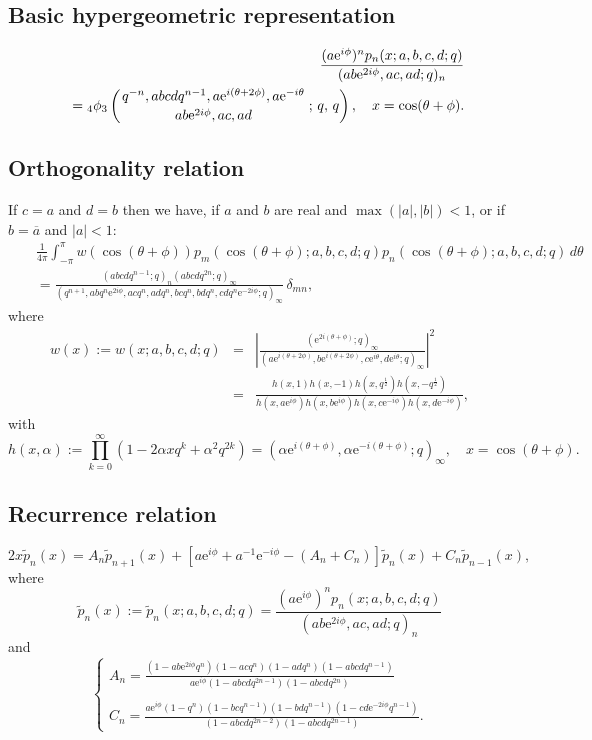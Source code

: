 \documentclass[envcountchap,graybox]{svmono}
\newcommand{\qhyp}[5]{\mbox{}_{#1}{\phi}_{#2}
\left(\genfrac{}{}{0pt}{}{#3}{#4}\,;\,q,\,#5\right)}
\newcommand{\e}{\textrm{e}}
\newcommand{\qhyp}[5]{\,\mbox{}_{#1}\phi_{#2}\!\left(
  \genfrac{}{}{0pt}{}{#3}{#4};#5\right)}
\begin{document}
\subsection*{Basic hypergeometric representation}
\begin{eqnarray}
\label{DefContqHahn}
& &\frac{(a\e^{i\phi})^np_n(x;a,b,c,d;q)}{(ab\e^{2i\phi},ac,ad;q)_n}\nonumber\\
& &{}=\qhyp{4}{3}{q^{-n},abcdq^{n-1},a\e^{i(\theta+2\phi)},a\e^{-i\theta}}
{ab\e^{2i\phi},ac,ad}{q},\quad x=\cos(\theta+\phi).
\end{eqnarray}

\subsection*{Orthogonality relation}
If $c=a$ and $d=b$ then we have, if $a$ and $b$ are real and
$\max(|a|,|b|)<1$, or if $b=\overline{a}$ and $|a|<1$:
\begin{eqnarray}
\label{OrtContqHahn}
& &\frac{1}{4\pi}\int_{-\pi}^{\pi}w(\cos(\theta+\phi))
p_m(\cos(\theta+\phi);a,b,c,d;q)p_n(\cos(\theta+\phi);a,b,c,d;q)\,d\theta\nonumber\\
& &{}=\frac{(abcdq^{n-1};q)_n(abcdq^{2n};q)_{\infty}}
{(q^{n+1},abq^n\e^{2i\phi},acq^n,adq^n,bcq^n,bdq^n,cdq^n\e^{-2i\phi};q)_{\infty}}\,\delta_{mn},
\end{eqnarray}
where
\begin{eqnarray*} w(x):=w(x;a,b,c,d;q)&=&\left|\frac{(\e^{2i(\theta+\phi)};q)_{\infty}}
{(a\e^{i(\theta+2\phi)},b\e^{i(\theta+2\phi)},
c\e^{i\theta},d\e^{i\theta};q)_{\infty}}\right|^2\\
&=&\frac{h(x,1)h(x,-1)h(x,q^{\frac{1}{2}})h(x,-q^{\frac{1}{2}})}
{h(x,a\e^{i\phi})h(x,b\e^{i\phi})h(x,c\e^{-i\phi})h(x,d\e^{-i\phi})},
\end{eqnarray*}
with
$$h(x,\alpha):=\prod_{k=0}^{\infty}\left(1-2\alpha xq^k+\alpha^2q^{2k}\right)
=\left(\alpha\e^{i(\theta+\phi)},\alpha\e^{-i(\theta+\phi)};q\right)_{\infty},
\quad x=\cos(\theta+\phi).$$

\subsection*{Recurrence relation}
\begin{equation}
\label{RecContqHahn}
2x{\tilde p}_n(x)=A_n{\tilde p}_{n+1}(x)+\left[a\e^{i\phi}+a^{-1}\e^{-i\phi}-\left(A_n+C_n\right)\right]{\tilde p}_n(x)+C_n{\tilde p}_{n-1}(x),
\end{equation}
where
$${\tilde p}_n(x):={\tilde p}_n(x;a,b,c,d;q)=\frac{(a\e^{i\phi})^np_n(x;a,b,c,d;q)}{(ab\e^{2i\phi},ac,ad;q)_n}$$
and
$$\left\{\begin{array}{l}
\displaystyle A_n=\frac{(1-ab\e^{2i\phi}q^n)(1-acq^n)(1-adq^n)(1-abcdq^{n-1})}{a\e^{i\phi}(1-abcdq^{2n-1})(1-abcdq^{2n})}\\
\\
\displaystyle C_n=\frac{a\e^{i\phi}(1-q^n)(1-bcq^{n-1})(1-bdq^{n-1})(1-cd\e^{-2i\phi}q^{n-1})}{(1-abcdq^{2n-2})(1-abcdq^{2n-1})}.
\end{array}\right.$$
\end{document}
